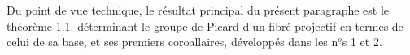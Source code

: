 
Du point de  vue technique, le résultat principal du présent paragraphe
est le théorème 1.1. déterminant le groupe de Picard d'un 
 fibré projectif  en termes de celui de sa base, et ses premiers
coroallaires, développés dans les n$^{\underline{o}}$s 1 et 2.

